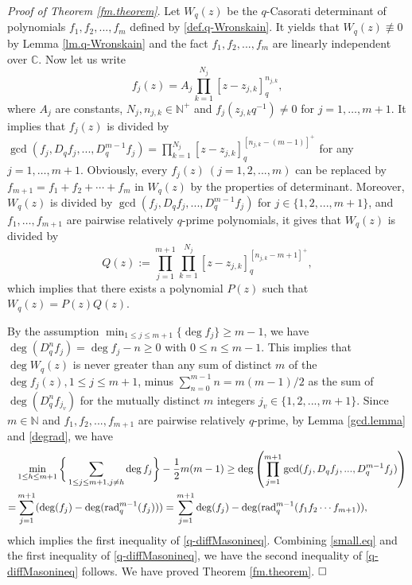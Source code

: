 \documentclass[a4paper,12pt]{article}
\newcommand{\C}{\mathbb{C}}
\newcommand{\N}{\mathbb{N}}
\numberwithin{equation}{section}
\begin{document}
\noindent
\emph{Proof of Theorem {\rm \ref{fm.theorem}}}.
Let $W_q(z)$ be the $q$-Casorati determinant of polynomials $f_1,f_2,...,f_m$ defined by \eqref{def.q-Wronskain}. It yields that $W_q(z) \not\equiv 0$ by
Lemma \ref{lm.q-Wronskain} and the fact $f_1,f_2,...,f_m$ are linearly independent over $\C$.
Now let us write
    $$
    f_j(z) = A_j \prod_{k=1}^{N_j}[z-z_{j,k}]_q^{n_{j,k}},
    $$
where $A_j$ are constants, $N_j,n_{j,k} \in \N^+$ and $f_j(z_{j,k}q^{-1}) \ne 0$ for
 $j=1,\ldots, m+1$. It implies that $f_j(z)$ is divided by $\gcd(f_j,D_qf_j,...,D_q^{m-1}f_j)=\prod_{k=1}^{N_j}[z-z_{j,k}]_q^{[n_{j,k}-(m-1)]^+}$ for any $j=1,\ldots, m+1$. Obviously, every $f_j(z)~(j=1,2,...,m)$ can be replaced by $f_{m+1}=f_1+f_2+\cdots+f_m$ in $W_q(z)$ by the properties of
determinant.
Moreover, $W_q(z)$ is divided by $\gcd (f_j,D_qf_j,...,D_q^{m-1}f_j)$ for $j \in \{ 1,2,...,m+1\}$, and $f_1,\ldots,f_{m+1}$ are pairwise relatively $q$-prime polynomials, it gives that $W_q(z)$ is divided by
    $$
    Q(z):=\prod_{j=1}^{m+1}\prod_{k=1}^{N_j}[z-z_{j,k}]_q^{[n_{j,k}-m+1]^+},
    $$
which implies that there exists a polynomial $P(z)$ such that $W_q(z)=P(z)Q(z)$.

By the assumption $\min_{1\leq j\leq m+1} \{\deg f_j\}\geq m-1$, we have $\deg (D_q^n f_j)=\deg f_j-n \ge 0$ with $0 \le n \le m-1$. This implies that $\deg W_q(z)$ is never greater than any sum of distinct $m$ of the $\deg f_j(z), 1\le j \le m+1$, minus $\sum_{n=0}^{m-1}n=m(m-1)/2$ as the sum of $\deg (D_q^n f_{j_v})$ for the mutually distinct $m$ integers $j_v \in \{ 1,2,...,m+1 \}$. Since $m \in \mathbb{N}$ and $f_1,f_2,...,f_{m+1}$ are pairwise relatively $q$-prime, by Lemma \ref{gcd.lemma} and \eqref{degrad}, we have
\begin{align}\nonumber
&\min_{1\leq h\leq m+1} \bigg\{\sum_{1 \le j\le m+1,j\ne h} \deg f_j \bigg\}-\frac{1}{2}m(m-1)
\ge \deg \left(\prod_{j=1}^{m+1} \gcd (f_j,D_qf_j,...,D_q^{m-1}f_j )\right)\\\nonumber
=& \sum_{j=1}^{m+1}(\deg (f_j)-\deg ({\rm rad}_q^{m-1} (f_j)))
= \sum_{j=1}^{m+1} \deg (f_j)- \deg ({\rm rad}_q^{m-1}(f_1f_2\cdots f_{m+1})),
\end{align}
which implies the first inequality of \eqref{q-diffMasonineq}. Combining \eqref{small.eq} and the first inequality of \eqref{q-diffMasonineq}, we have the second inequality of \eqref{q-diffMasonineq} follows. We have proved Theorem \ref{fm.theorem}.  $\hfill\square$
\end{document}

